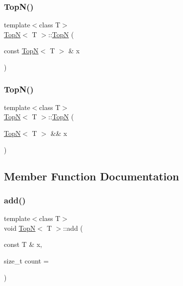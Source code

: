 \mbox{\label{class_top_n_a8bd54bb09006a68c350a173eddc55549}} 
\subsubsection{\texorpdfstring{Top\+N()}{TopN()}\hspace{0.1cm}{\footnotesize\ttfamily [2/3]}}
{\footnotesize\ttfamily template$<$class T$>$ \\
\hyperlink{class_top_n}{TopN}$<$ T $>$\+::\hyperlink{class_top_n}{TopN} (\begin{DoxyParamCaption}\item[{const \hyperlink{class_top_n}{TopN}$<$ T $>$ \&}]{x }\end{DoxyParamCaption})\hspace{0.3cm}{\ttfamily [inline]}}

\mbox{\label{class_top_n_ab7bccf0028a9a4972cd8d5ae4a555553}} 
\subsubsection{\texorpdfstring{Top\+N()}{TopN()}\hspace{0.1cm}{\footnotesize\ttfamily [3/3]}}
{\footnotesize\ttfamily template$<$class T$>$ \\
\hyperlink{class_top_n}{TopN}$<$ T $>$\+::\hyperlink{class_top_n}{TopN} (\begin{DoxyParamCaption}\item[{\hyperlink{class_top_n}{TopN}$<$ T $>$ \&\&}]{x }\end{DoxyParamCaption})\hspace{0.3cm}{\ttfamily [inline]}}



\subsection{Member Function Documentation}
\mbox{\label{class_top_n_a4fdddece51570832503747bf85d5ec19}} 
\subsubsection{\texorpdfstring{add()}{add()}\hspace{0.1cm}{\footnotesize\ttfamily [1/2]}}
{\footnotesize\ttfamily template$<$class T$>$ \\
void \hyperlink{class_top_n}{TopN}$<$ T $>$\+::add (\begin{DoxyParamCaption}\item[{const T \&}]{x,  }\item[{size\+\_\+t}]{count = {} }\end{DoxyParamCaption})\hspace{0.3cm}{\ttfamily [inline]}}

